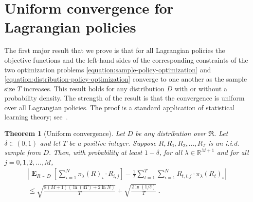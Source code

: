 \documentclass[12pt]{article}
\newcommand{\R}{\mathbb{R}}
\newcommand{\Requests}{\mathfrak{R}}
\DeclareMathOperator*{\Exp}{\mathbf{E}}
\newtheorem{theorem}{Theorem}
\theoremstyle{definition}
\begin{document}
\section{Uniform convergence for Lagrangian policies}

The first major result that we prove is that for all Lagrangian policies the
objective functions and the left-hand sides of the corresponding constraints of
the two optimization problems \eqref{equation:sample-policy-optimization} and
\eqref{equation:distribution-policy-optimization} converge to one another as the
sample size $T$ increases. This result holds for any distribution $D$ with or
without a probability density. The strength of the result is that the
convergence is uniform over all Lagrangian policies. The proof is a standard
application of statistical learning theory; see~\cite{Devroye-Lugosi-2001}.

\begin{theorem}[Uniform convergence]
\label{theorem:uniform-convergence}
Let $D$ be any distribution over $\Requests$. Let $\delta \in (0,1)$ and let $T$
be a positive integer. Suppose $R, R_1, R_2, \dots, R_T$ is an i.i.d. sample
from $D$. Then, with probability at least $1-\delta$, for all $\lambda \in
\R^{M+1}$ and for all $j=0,1,2,\dots,M$,
\begin{multline*}
\left| \Exp_{R \sim D} \left[ \sum_{i=1}^N \pi_\lambda(R)_i \cdot R_{i,j}  \right]  -  \frac{1}{T} \sum_{t=1}^T \sum_{i=1}^N R_{t,i,j} \cdot \pi_\lambda(R_t)_i  \right|
\\
\le \sqrt{\frac{8(M+1) (\ln(4T) + 2 \ln N)}{T}} + \sqrt{ \frac{2\ln(1/\delta)}{T} } \: .
\end{multline*}
\end{theorem}
\end{document}
